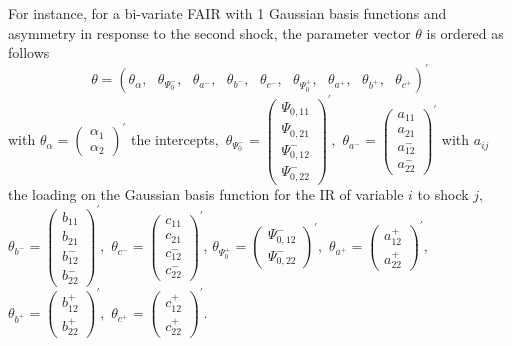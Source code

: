 \documentclass[a4paper,12pt]{article}
\begin{document}
For instance, for a bi-variate FAIR with 1 Gaussian basis functions and asymmetry in response to the second shock, the parameter vector $\theta $ is ordered as follows%
\begin{equation}
\theta =\left( \theta _{\alpha },\text{ }\theta _{\Psi _{0}^{-}},\text{ }%
\theta _{a^{-}},\text{ }\theta _{b^{-}},\text{ }\theta _{c^{-}},\text{ }%
\theta _{\Psi _{0}^{+}},\text{ }\theta _{a^{+}},\text{ }\theta _{b^{+}},%
\text{ }\theta _{c^{+}}\right) ^{\prime }  \label{theta}
\end{equation}%
with $\theta _{\alpha }=\left( 
\begin{array}{c}
\alpha _{1} \\ 
\alpha _{2}%
\end{array}%
\right) ^{\prime }$ the intercepts$,$ $\theta _{\Psi _{0}^{-}}=\left( 
\begin{array}{c}
\Psi _{0,11} \\ 
\Psi _{0,21} \\ 
\Psi _{0,12}^{-} \\ 
\Psi _{0,22}^{-}%
\end{array}%
\right) ^{\prime },$ $\theta _{a^{-}}=\left( 
\begin{array}{c}
a_{11} \\ 
a_{21} \\ 
a_{12}^{-} \\ 
a_{22}^{-}%
\end{array}%
\right) ^{\prime }$ with $a_{ij}$ the loading on the Gaussian basis function
for the IR of variable $i$ to shock $j,$ $\theta _{b^{-}}=\left( 
\begin{array}{c}
b_{11} \\ 
b_{21} \\ 
b_{12}^{-} \\ 
b_{22}^{-}%
\end{array}%
\right) ^{\prime },$ $\theta _{c^{-}}=\left( 
\begin{array}{c}
c_{11} \\ 
c_{21} \\ 
c_{12}^{-} \\ 
c_{22}^{-}%
\end{array}%
\right) ^{\prime }$, $\theta _{\Psi _{0}^{+}}=\left( 
\begin{array}{c}
\Psi _{0,12}^{-} \\ 
\Psi _{0,22}^{-}%
\end{array}%
\right) ^{\prime },$ $\theta _{a^{+}}=\left( 
\begin{array}{c}
a_{12}^{+} \\ 
a_{22}^{+}%
\end{array}%
\right) ^{\prime },$ $\theta _{b^{+}}=\left( 
\begin{array}{c}
b_{12}^{+} \\ 
b_{22}^{+}%
\end{array}%
\right) ^{\prime },$ $\theta _{c^{+}}=\left( 
\begin{array}{c}
c_{12}^{+} \\ 
c_{22}^{+}%
\end{array}%
\right) ^{\prime }.$
\end{document}
